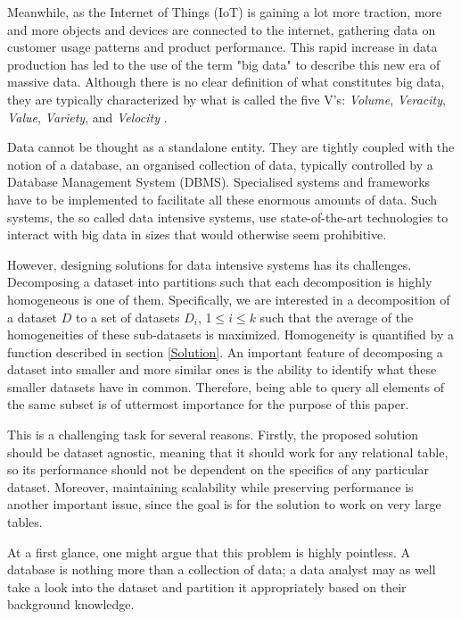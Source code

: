 \documentclass[sigconf]{acmart}
\begin{document}
Meanwhile, as the Internet of Things (IoT) is gaining a lot more traction, more and more objects and devices are connected to the internet, gathering data on customer usage patterns and product performance. This rapid increase in data production has led to the use of the term "big data" \cite{5V's} to describe this new era of massive data. Although there is no clear definition of what constitutes big data, they are typically characterized by what is called the five V's: \textit{Volume}, \textit{Veracity}, \textit{Value}, \textit{Variety}, and \textit{Velocity} \cite{5V's}.

Data cannot be thought as a standalone entity. They are tightly coupled with the notion of a database, an organised collection of data, typically controlled by a Database Management System (DBMS). Specialised systems and frameworks have to be implemented to facilitate all these enormous amounts of data. Such systems, the so called data intensive systems, use state-of-the-art technologies to interact with big data in sizes that would otherwise seem prohibitive.

However, designing solutions for data intensive systems has its challenges. Decomposing a dataset into partitions such that each decomposition is highly homogeneous is one of them. Specifically, we are interested in a decomposition of a dataset $D$ to a set of datasets $D_i$, 1$\leq i \leq k$ such that the average of the homogeneities of these	sub-datasets is maximized. Homogeneity is quantified by a function described in section \ref{Solution}. An important feature of decomposing a dataset into smaller and more similar ones is the ability to identify what these smaller datasets have in common. Therefore, being able to query all elements of the same subset is of uttermost importance for the purpose of this paper.

This is a challenging task for several reasons. Firstly, the proposed solution should be dataset agnostic, meaning that it should work for any relational table, so its performance should not be dependent on the specifics of any particular dataset. Moreover, maintaining scalability while preserving performance is another important issue, since the goal is for the solution to work on very large tables.


At a first glance, one might argue that this problem is highly pointless. A database is nothing more than a collection of data; a data analyst may as well take a look into the dataset and partition it appropriately based on their background knowledge.
\end{document}
